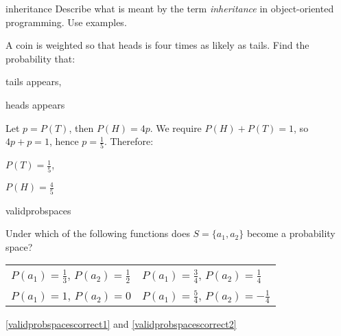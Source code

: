 
\begin{defproblem}{inheritance}
 Describe what is meant by the term \emph{inheritance} in
 object-oriented programming. Use examples.
\end{defproblem}

%
{%
   A coin is weighted so that heads is four times as likely
   as tails. Find the probability that:
   \begin{textenum}
     \item tails appears,
     \item heads appears
   \end{textenum}%
}%
{%
   Let $p=P(T)$, then $P(H)=4p$. We require $P(H)+P(T)=1$,
   so $4p+p=1$, hence $p=\frac{1}{5}$. Therefore:
   \begin{textenum}
     \item $P(T)=\frac{1}{5}$,
     \item $P(H)=\frac{4}{5}$
   \end{textenum}
}

\begin{defproblem}{validprobspaces}
\begin{onlyproblem}%
Under which of the following functions does
$S=\{a_1,a_2\}$ become a probability space?
\par
\begin{textenum}
\begin{tabular}{ll}
\item $P(a_1)=\frac{1}{3}$, $P(a_2)=\frac{1}{2}$
&
\item\label{validprobspacescorrect1} $P(a_1)=\frac{3}{4}$,
$P(a_2)=\frac{1}{4}$
\\
\item\label{validprobspacescorrect2} $P(a_1)=1$, $P(a_2)=0$
&
\item $P(a_1)=\frac{5}{4}$, $P(a_2)=-\frac{1}{4}$
\end{tabular}
\end{textenum}
\end{onlyproblem}%
\begin{onlysolution}%
\ref{validprobspacescorrect1} and \ref{validprobspacescorrect2}%
\end{onlysolution}
\end{defproblem}

